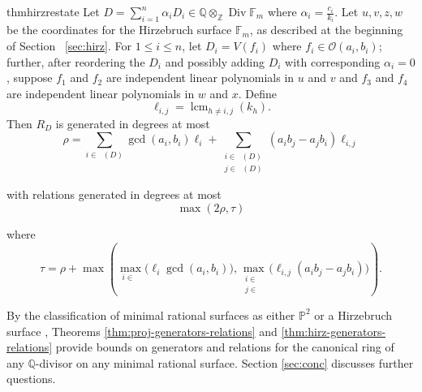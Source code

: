 \documentclass{amsart}
\theoremstyle{plain}
\theoremstyle{definition}
\theoremstyle{remark}
\numberwithin{equation}{section}
\newcommand\bq{{\mathbb Q}}
\newcommand\bp{{\mathbb P}}
\newcommand\bz{{\mathbb Z}}
\newcommand\sco{{\mathscr O}}
\DeclareMathOperator\di{Div}
\newcommand\bida{a}
\newcommand\bidb{b}
\newcommand\hirz{\mathbb{F}}
\DeclareMathOperator{\Te}{T_=}
\DeclareMathOperator{\Tp}{T_+}
\DeclareMathOperator{\Tm}{T_-}
\DeclareMathOperator{\lcm}{lcm}
\begin{document}
\begin{restatable}{thm}{hirzrestate}
\label{thm:hirz-generators-relations}
Let $D = \sum_{i=1}^n \alpha_i D_i \in \bq
\otimes_\bz \di \hirz_m$ 
where $\alpha_i = \frac{c_i}{k_i}$.
Let $u,v,z,w$ be the coordinates for the Hirzebruch surface
$\hirz_m$, as described at the beginning of Section
~\ref{sec:hirz}. For $1 \leq i \leq n$, let $D_i =
V(f_i)$ where $f_i \in \sco(a_i, b_i)$; further, after reordering
the $D_i$ and possibly adding $D_i$ with corresponding $\alpha_i = 0$, suppose $f_1$ and $f_2$ are
independent linear
polynomials in $u$ and $v$ and $f_3$ and $f_4$ are independent
linear polynomials in $w$ and $x$.
Define
\[\ell_{i,j} = \lcm_{h\ne i,j}(k_h).\] 
Then $R_D$ is generated in degrees at most
\[
	\rho = \sum_{i\in \Te(D)} \gcd(\bida_i, \bidb_i)\ell_i +
	\sum_{\substack{i \in \Tp(D) \\	j \in \Tm(D)}} (\bida_i \bidb_j
	- \bida_j \bidb_i) \ell_{i, j}
\]

\noindent
with relations generated in degrees at most 
\[
	\max(2 \rho, \tau)
\]

\noindent
where
\[
	\tau = \rho
	+ \max \left( \max_{i\in \Te} \bigl(\ell_i \gcd(a_i, b_i) \bigr),
	\max_{\substack{i \in \Tp \\ j \in \Tm}} \bigl(\ell_{i, j}
	(\bida_i \bidb_j - \bida_j \bidb_i) \bigr) \right).
\]
\end{restatable}

\noindent
By the classification of minimal rational surfaces
as either $\bp^2$ or a Hirzebruch surface \cite{eisenbud-harris:minimal},
Theorems \ref{thm:proj-generators-relations} and
\ref{thm:hirz-generators-relations} provide bounds on generators
and relations for the canonical ring of any $\bq$-divisor on any
minimal rational surface. Section \ref{sec:conc} discusses further questions.
\end{document}
